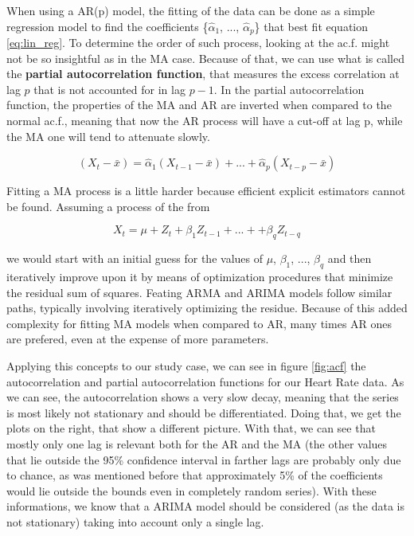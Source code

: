 \documentclass[../main.tex]{subfiles}
\begin{document}
        When using a AR(p) model, the fitting of the data can be done as a simple regression model to find the coefficients \{$\hat{\alpha}_1$, ..., $\hat{\alpha}_p$\} that best fit equation \ref{eq:lin_reg}. To determine the order of such process, looking at the ac.f. might not be so insightful as in the MA case. Because of that, we can use what is called the \textbf{partial autocorrelation function}, that measures the excess correlation at lag $p$ that is not accounted for in lag $p-1$. In the partial autocorrelation function, the properties of the MA and AR are inverted when compared to the normal ac.f., meaning that now the AR process will have a cut-off at lag p, while the MA one will tend to attenuate slowly.
        
        \begin{equation}
            \label{eq:lin_reg}
            (X_t-\bar{x}) = \hat{\alpha}_1(X_{t-1}-\bar{x}) + ... + \hat{\alpha}_p(X_{t-p}-\bar{x})
        \end{equation}

        Fitting a MA process is a little harder because efficient explicit estimators cannot be found. Assuming a process of the from

        \begin{equation}
            \label{eq:ma}
            X_t = \mu + Z_t + \beta_1Z_{t-1} + ... + + \beta_qZ_{t-q}
        \end{equation}

        we would start with an initial guess for the values of $\mu$, $\beta_1$, ..., $\beta_q$ and then iteratively improve upon it by means of optimization procedures that minimize the residual sum of squares. Feating ARMA and ARIMA models follow similar paths, typically involving iteratively optimizing the residue. Because of this added complexity for fitting MA models when compared to AR, many times AR ones are prefered, even at the expense of more parameters.\par

        Applying this concepts to our study case, we can see in figure \ref{fig:acf} the autocorrelation and partial autocorrelation functions for our Heart Rate data. As we can see, the autocorrelation shows a very slow decay, meaning that the series is most likely not stationary and should be differentiated. Doing that, we get the plots on the right, that show a different picture. With that, we can see that mostly only one lag is relevant both for the AR and the MA (the other values that lie outside the 95\% confidence interval in farther lags are probably only due to chance, as was mentioned before that approximately 5\% of the coefficients would lie outside the bounds even in completely random series). With these informations, we know that a ARIMA model should be considered (as the data is not stationary) taking into account only a single lag. \par 
\end{document}
